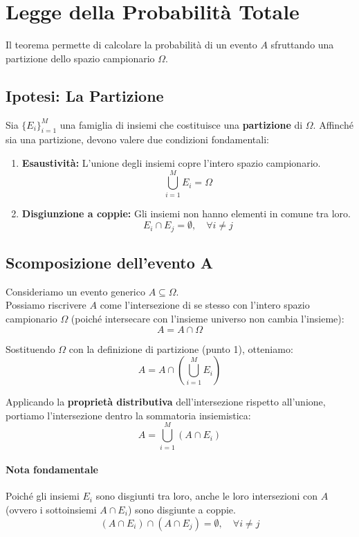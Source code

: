\section{Legge della Probabilità Totale}
Il teorema permette di calcolare la probabilità di un evento $A$ sfruttando una partizione dello spazio campionario $\Omega$.

\subsection{Ipotesi: La Partizione}

Sia $\{E_i\}_{i=1}^M$ una famiglia di insiemi che costituisce una \textbf{partizione} di $\Omega$. Affinché sia una partizione, devono valere due condizioni fondamentali:

\begin{enumerate}
    \item \textbf{Esaustività:} L'unione degli insiemi copre l'intero spazio campionario.
    \[ \bigcup_{i=1}^M E_i = \Omega \]
    
    \item \textbf{Disgiunzione a coppie:} Gli insiemi non hanno elementi in comune tra loro.
    \[ E_i \cap E_j = \emptyset, \quad \forall i \neq j \]
\end{enumerate}

\subsection{Scomposizione dell'evento A}

Consideriamo un evento generico $A \subseteq \Omega$.
\\Possiamo riscrivere $A$ come l'intersezione di se stesso con l'intero spazio campionario $\Omega$ (poiché intersecare con l'insieme universo non cambia l'insieme):
\[ A = A \cap \Omega \]

Sostituendo $\Omega$ con la definizione di partizione (punto 1), otteniamo:
\[ A = A \cap \left( \bigcup_{i=1}^M E_i \right) \]

Applicando la \textbf{proprietà distributiva} dell'intersezione rispetto all'unione, portiamo l'intersezione dentro la sommatoria insiemistica:
\[ A = \bigcup_{i=1}^M (A \cap E_i) \]

\paragraph{Nota fondamentale}
Poiché gli insiemi $E_i$ sono disgiunti tra loro, anche le loro intersezioni con $A$ (ovvero i sottoinsiemi $A \cap E_i$) sono disgiunte a coppie.
\[ (A \cap E_i) \cap (A \cap E_j) = \emptyset, \quad \forall i \neq j \]

